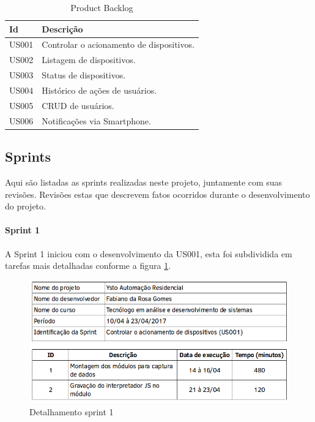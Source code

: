 \begin{table}[H]
   \caption{Product Backlog}
   \label{product}
{
   \begin{tabular}{ll}
   \toprule
   Id & Descrição \\
   \midrule \midrule
   
    US001 & Controlar o acionamento de dispositivos. \\
    US002 & Listagem de dispositivos. \\
    US003 & Status de dispositivos. \\
    US004 & Histórico de ações de usuários. \\
    US005 & CRUD de usuários. \\
    US006 & Notificações via Smartphone. \\

   \bottomrule
   \end{tabular}
}{
}
\end{table}

\subsection{Sprints}
Aqui são listadas as sprints realizadas neste projeto, juntamente com suas revisões. Revisões estas que descrevem fatos ocorridos durante o desenvolvimento do projeto.

\paragraph{Sprint 1} A Sprint 1 iniciou com o desenvolvimento da US001, esta foi subdividida em tarefas mais detalhadas conforme a figura \ref{sprint-1}.

\begin{figure}[H]
\caption{\label{sprint-1} Detalhamento sprint 1}
\includegraphics[scale=0.5]{img/sprint-1.png}
\end{figure}

